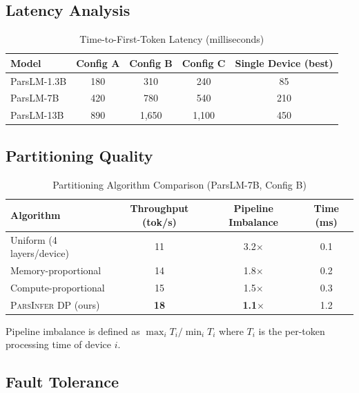 \documentclass[11pt,a4paper]{article}
\newcommand{\parsdi}{\textsc{ParsInfer}\xspace}
\begin{document}
\subsection{Latency Analysis}

\begin{table}[H]
\centering
\caption{Time-to-First-Token Latency (milliseconds)}
\label{tab:ttft}
\begin{tabular}{lcccc}
\toprule
\textbf{Model} & \textbf{Config A} & \textbf{Config B} & \textbf{Config C} & \textbf{Single Device (best)} \\
\midrule
ParsLM-1.3B & 180 & 310 & 240 & 85 \\
ParsLM-7B & 420 & 780 & 540 & 210 \\
ParsLM-13B & 890 & 1{,}650 & 1{,}100 & 450 \\
\bottomrule
\end{tabular}
\end{table}

\subsection{Partitioning Quality}

\begin{table}[H]
\centering
\caption{Partitioning Algorithm Comparison (ParsLM-7B, Config B)}
\label{tab:partition}
\begin{tabular}{lccc}
\toprule
\textbf{Algorithm} & \textbf{Throughput (tok/s)} & \textbf{Pipeline Imbalance} & \textbf{Time (ms)} \\
\midrule
Uniform (4 layers/device) & 11 & 3.2$\times$ & 0.1 \\
Memory-proportional & 14 & 1.8$\times$ & 0.2 \\
Compute-proportional & 15 & 1.5$\times$ & 0.3 \\
\parsdi DP (ours) & \textbf{18} & \textbf{1.1$\times$} & 1.2 \\
\bottomrule
\end{tabular}
\end{table}

Pipeline imbalance is defined as $\max_i T_i / \min_i T_i$ where $T_i$ is the per-token processing time of device $i$.

\subsection{Fault Tolerance}
\end{document}
